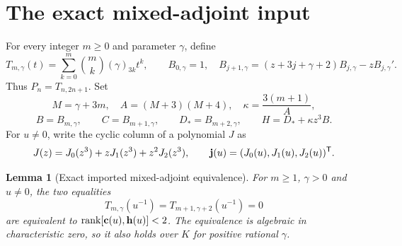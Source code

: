 \documentclass[11pt]{article}
\newtheorem{lemma}{Lemma}
\begin{document}
\section{The exact mixed-adjoint input}
For every integer $m\ge0$ and parameter $\gamma$, define
\[
 T_{m,\gamma}(t)=\sum_{k=0}^m\binom mk(\gamma)_{3k}t^k,\qquad
 B_{0,\gamma}=1,\quad
 B_{j+1,\gamma}=(z+3j+\gamma+2)B_{j,\gamma}
                       -zB_{j,\gamma}' .
\]
Thus $P_n=T_{n,2n+1}$. Set
\[
 M=\gamma+3m,\quad A=(M+3)(M+4),\quad
 \kappa=\frac{3(m+1)}{A},
\]
\[
 B=B_{m,\gamma},\qquad C=B_{m+1,\gamma},\qquad
 D_*=B_{m+2,\gamma},\qquad H=D_*+\kappa z^3B.
\]
For $u\ne0$, write the cyclic column of a polynomial $J$ as
\[
 J(z)=J_0(z^3)+zJ_1(z^3)+z^2J_2(z^3),\qquad
 {\bf j}(u)=(J_0(u),J_1(u),J_2(u))^{\mathsf T}.
\]
\begin{lemma}[Exact imported mixed-adjoint equivalence]\label{lem:mixed-input}
For $m\ge1$, $\gamma>0$ and $u\ne0$, the two equalities
\[
 T_{m,\gamma}(u^{-1})=T_{m+1,\gamma+2}(u^{-1})=0
\]
are equivalent to $\operatorname{rank}[{\bf c}(u),{\bf h}(u)]<2$.
The equivalence is algebraic in characteristic zero, so it also holds
over $K$ for positive rational $\gamma$.
\end{lemma}
\end{document}
